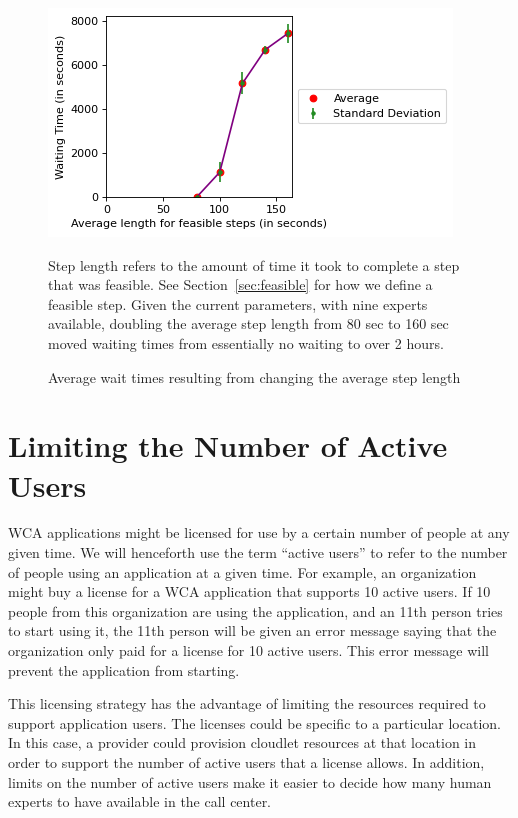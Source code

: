 \begin{figure}[H]
  \includegraphics{figures/montecarlo/vary_step_length.png}
  \begin{captiontext}
    Step length refers to the amount of time it took to complete a step that was
    feasible.
    See Section~\ref{sec:feasible} for how we define a feasible step.
    Given the current parameters, with nine experts available, doubling the
    average
    step length from 80 sec to 160 sec moved waiting times from essentially no
    waiting to over 2 hours.
  \end{captiontext}
  \caption{
    Average wait times resulting from changing the average step length
  }\label{fig:vary_step_length}
\end{figure}

\section{Limiting the Number of Active Users}

WCA applications might be licensed for use by a certain number of people at
any given time.
We will henceforth use the term ``active users'' to refer to the number of
people using an application at a given time.
For example, an organization might buy a license for a WCA application that
supports 10 active users.
If 10 people from this organization are using the application, and an 11th
person tries to start using it, the 11th person will be given an error message
saying that the organization only paid for a license for 10 active users.
This error message will prevent the application from starting.

This licensing strategy has the advantage of limiting the resources required to
support application users.
The licenses could be specific to a particular location.
In this case, a provider could provision cloudlet resources at that location in
order to support the number of active users that a license allows.
In addition, limits on the number of active users make it easier to decide how
many human experts to have available in the call center.

